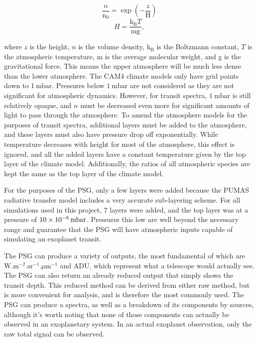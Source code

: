 \begin{multicols}{2}
    \begin{equation}
    \frac{n}{\mathrm{n_0}}=\exp\left(-\frac{z}{\mathrm{H}}\right)
    \end{equation}
    \break
    \begin{equation}
    H=\frac{\mathrm{k_B}T}{\mathrm{mg}},
    \end{equation}
\end{multicols}
\noindent
where $z$ is the height, $n$ is the volume density, $\mathrm{k_B}$ is the
 Boltzmann constant, $T$ is the atmospheric temperature, m is the average
 molecular weight, and g is the gravitational force. This means the upper
 atmosphere will be much less dense than the lower atmosphere. The CAM4 climate
 models only have grid points down to $\SI{1}{\milli\bar}$. Pressures below
 $\SI{1}{\milli\bar}$ are not considered as they are not significant for
 atmospheric dynamics. However, for transit spectra, $\SI{1}{\milli\bar}$ is
 still relatively opaque, and $n$ must be decreased even more for significant
 amounts of light to pass through the atmosphere. To amend the atmosphere models
 for the purposes of transit spectra, additional layers must be added to the
 atmosphere, and these layers must also have pressure drop off exponentially.
 While temperature decreases with height for most of the atmosphere, this
 effect is ignored,
 and all the added layers have a constant temperature given by the top layer of
 the climate model. Additionally, the ratios of all atmospheric species are kept
 the same as the top layer of the climate model.

For the purposes of the PSG, only a few layers were added because the PUMAS
 radiative transfer model includes a very accurate sub-layering scheme. For all
 simulations used in this project, 7 layers were added, and the top layer was at
 a pressure of $\SI{10d-6}{\milli\bar}$. Pressures this low are well beyond the
 necessary range and guarantee that the PSG will have atmospheric inputs capable
 of simulating an exoplanet transit.

The PSG can produce a variety of outputs, the most fundamental of which are
 $\si{\watt.\meter^{-2}.\steradian^{-1}.\micro\meter^{-1}}$ and ADU, which
 represent what a
 telescope would actually see. The PSG can also return an already reduced output
 that simply shows the transit depth. This reduced method can be derived from
 either raw method, but is more convenient for analysis, and is therefore the
 most commonly used. The PSG can produce a spectra, as well as a breakdown of
 its components by sources, although it's worth noting that none of those
 components can actually be observed in an exoplanetary system. In an actual
 exoplanet observation, only the raw total signal can be observed.

